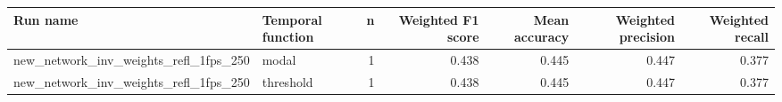 \begin{tabular}{llrrrrr}
\toprule
Run name & Temporal function & n & Weighted F1 score & Mean accuracy & Weighted precision & Weighted recall \\
\midrule
new_network_inv_weights_refl_1fps_250 & modal & 1 & 0.438 & 0.445 & 0.447 & 0.377 \\
new_network_inv_weights_refl_1fps_250 & threshold & 1 & 0.438 & 0.445 & 0.447 & 0.377 \\
\bottomrule
\end{tabular}
